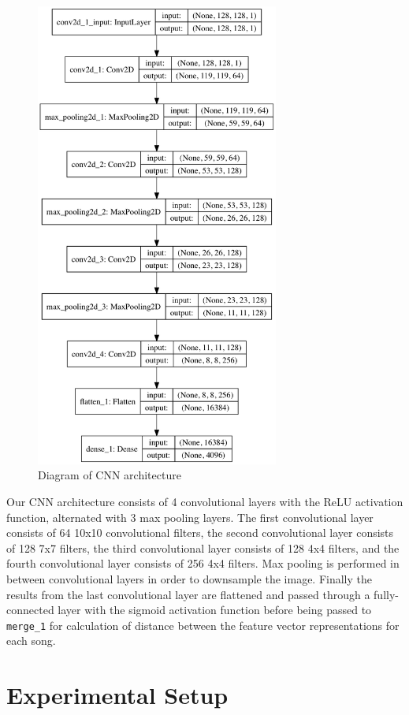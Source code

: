 \begin{figure}[H]
\centering
\includegraphics[width=8cm]{figures/conv_net.png}
\caption{Diagram of CNN architecture}
\end{figure}

Our CNN architecture consists of 4 convolutional layers with the ReLU activation function, alternated with 3 max pooling layers. The first convolutional layer consists of 64 10x10 convolutional filters, the second convolutional layer consists of 128 7x7 filters, the third convolutional layer consists of 128 4x4 filters, and the fourth convolutional layer consists of 256 4x4 filters. Max pooling is performed in between convolutional layers in order to downsample the image. Finally the results from the last convolutional layer are flattened and passed through a fully-connected layer with the sigmoid activation function before being passed to \texttt{merge\_1} for calculation of distance between the feature vector representations for each song.



\section{Experimental Setup}


